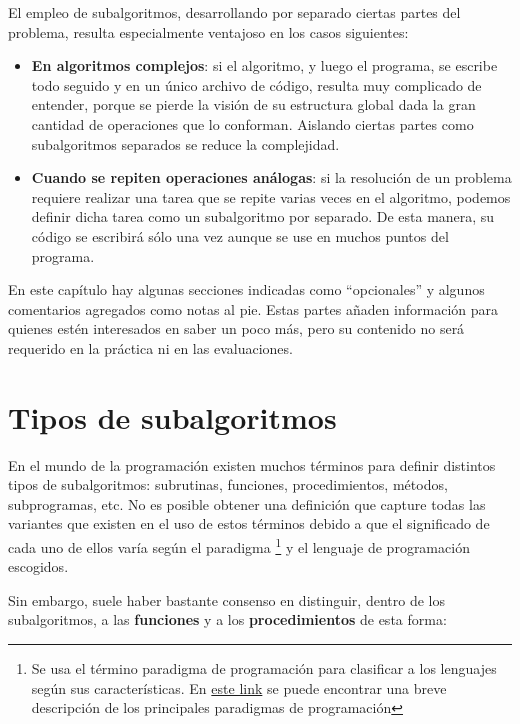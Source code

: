\documentclass[
]{book}
\providecommand{\tightlist}{%
  \setlength{\itemsep}{0pt}\setlength{\parskip}{0pt}}
\begin{document}
El empleo de subalgoritmos, desarrollando por separado ciertas partes del problema, resulta especialmente ventajoso en los casos siguientes:

\begin{itemize}
\tightlist
\item
  \textbf{En algoritmos complejos}: si el algoritmo, y luego el programa, se escribe todo seguido y en un único archivo de código, resulta muy complicado de entender, porque se pierde la visión de su estructura global dada la gran cantidad de operaciones que lo conforman. Aislando ciertas partes como subalgoritmos separados se reduce la complejidad.
\item
  \textbf{Cuando se repiten operaciones análogas}: si la resolución de un problema requiere realizar una tarea que se repite varias veces en el algoritmo, podemos definir dicha tarea como un subalgoritmo por separado. De esta manera, su código se escribirá sólo una vez aunque se use en muchos puntos del programa.
\end{itemize}

En este capítulo hay algunas secciones indicadas como ``opcionales'' y algunos comentarios agregados como notas al pie. Estas partes añaden información para quienes estén interesados en saber un poco más, pero su contenido no será requerido en la práctica ni en las evaluaciones.

\hypertarget{tipos-de-subalgoritmos}{%
\section{Tipos de subalgoritmos}\label{tipos-de-subalgoritmos}}

En el mundo de la programación existen muchos términos para definir distintos tipos de subalgoritmos: subrutinas, funciones, procedimientos, métodos, subprogramas, etc. No es posible obtener una definición que capture todas las variantes que existen en el uso de estos términos debido a que el significado de cada uno de ellos varía según el paradigma
\footnote{Se usa el término paradigma de programación para clasificar a los lenguajes según sus características. En \href{https://hackr.io/blog/programming-paradigms}{este link} se puede encontrar una breve descripción de los principales paradigmas de programación}
y el lenguaje de programación escogidos.

Sin embargo, suele haber bastante consenso en distinguir, dentro de los subalgoritmos, a las \textbf{funciones} y a los \textbf{procedimientos} de esta forma:
\end{document}
